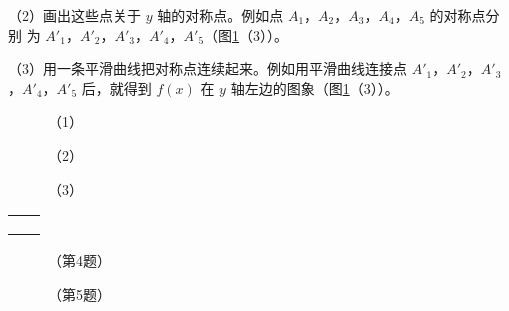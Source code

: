 （2）画出这些点关于 $y$ 轴的对称点。例如点 $A_1$，$A_2$，$A_3$，$A_4$，$A_5$ 的对称点分别
为 $A'_1$，$A'_2$，$A'_3$，$A'_4$，$A'_5$（图\ref{fig:1-22}（3））。

（3）用一条平滑曲线把对称点连续起来。例如用平滑曲线连接点 $A'_1$，$A'_2$，$A'_3$，$A'_4$，$A'_5$ 后，就得到
$f(x)$ 在 $y$ 轴左边的图象（图\ref{fig:1-22}（3））。

\begin{figure}[htbp]
    \centering
    \begin{minipage}{8cm}
    \centering
    
    \caption*{（1）}
    \end{minipage}
    \qquad
    \begin{minipage}{8cm}
    \centering
    
    \caption*{（2）}
    \end{minipage}
    \qquad
    \begin{minipage}{8cm}
    \centering
    
    \caption*{（3）}
    \end{minipage}
    \caption{}\label{fig:1-22}
\end{figure}

\lianxi
\begin{xiaotis}


\begin{xiaoxiaotis}
    \begin{tabular}[t]{*{2}{@{}p{14em}}} 
         &  \\
         &  \\
    \end{tabular}
\end{xiaoxiaotis}



\begin{figure}[H]
    \centering
    \begin{minipage}{8cm}
    \centering
    
    \caption*{（第4题）}
    \end{minipage}
    \qquad
    \begin{minipage}{8cm}
    \centering
    
    \caption*{（第5题）}
    \end{minipage}
\end{figure}



\end{xiaotis}
